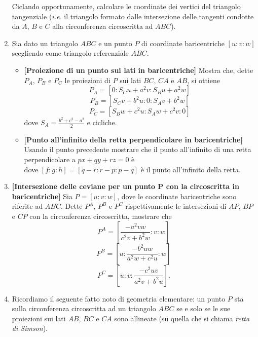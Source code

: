\begin{enumerate}
	Ciclando opportunamente, calcolare le coordinate dei vertici del triangolo tangenziale (\textit{i.e.} il triangolo formato dalle intersezione delle tangenti condotte da $A$, $B$ e $C$ alla circonferenza circoscritta ad $ABC$).
	\item Sia dato un triangolo $ABC$ e un punto $P$ di coordinate baricentriche $[u:v:w]$ scegliendo come triangolo referenziale $ABC$.
		\begin{itemize}
			\item \textbf{[Proiezione di un punto sui lati in baricentriche]} Mostra che, dette $P_A$, $P_B$ e $P_C$ le proiezioni di $P$ sui lati $BC$, $CA$ e $AB$, si ottiene
			$$
			P_A = [0: S_Cu+a^2v:S_Bu+a^2w]
			$$
			$$
			P_B = [S_Cv+b^2u: 0: S_Av+b^2w]
			$$
			$$
			P_C = [S_Bw+c^2u: S_Aw+c^2v: 0]
			$$			
			dove $S_A=\displaystyle\frac{b^2+c^2-a^2}{2}$ e cicliche.
			\item  \textbf{[Punto all'infinito della retta perpendicolare in baricentriche]} Usando il punto precedente mostrare che 
			il punto all'infinito di una retta perpendicolare a $px+qy+rz=0$ è
			\begin{equation}
			[S_Bg-S_Ch:S_Ch-S_Af:S_Af-S_Bg]
			\end{equation}
			dove $[f:g:h]=[q-r:r-p:p-q]$ è il punto all'infinito della retta.
		\end{itemize}
	\item \textbf{[Intersezione delle ceviane per un punto P con la circoscritta in baricentriche]} Sia $P=[u:v:w]$, dove le coordinate baricentriche 
	sono riferite ad $ABC$. Dette $P^A$, $P^B$ e $P^C$ rispettivamente le intersezioni di $AP$, $BP$ e $CP$ con la circonferenza circoscritta, mostrare che 
	$$
	P^A=\left[\displaystyle\frac{-a^2vw}{c^2v+b^2w}:v:w\right]
	$$
	$$
	P^B=\left[u:\displaystyle\frac{-b^2uw}{a^2w+c^2u}:w\right]
	$$
	$$
	P^C=\left[u:v:\displaystyle\frac{-c^2uv}{a^2v+b^2u}\right].
	$$
	\item Ricordiamo il seguente fatto noto di geometria elementare: un punto $P$ sta sulla circonferenza circoscritta ad un triangolo $ABC$ se e solo se le sue proiezioni sui lati $AB$, $BC$ e $CA$ sono allineate (su quella che si chiama \textit{retta di Simson}). 
	

\end{enumerate}
